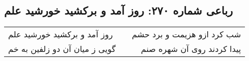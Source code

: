 \begin{center}
\section*{رباعی شماره ۲۷۰: روز آمد و برکشید خورشید علم}
\label{sec:sh270}
\begin{longtable}{l p{0.5cm} r}
روز آمد و برکشید خورشید علم
&&
شب کرد ازو هزیمت و برد حشم
\\
گویی ز میان آن دو زلفین به خم
&&
پیدا کردند روی آن شهره صنم
\\
\end{longtable}
\end{center}
